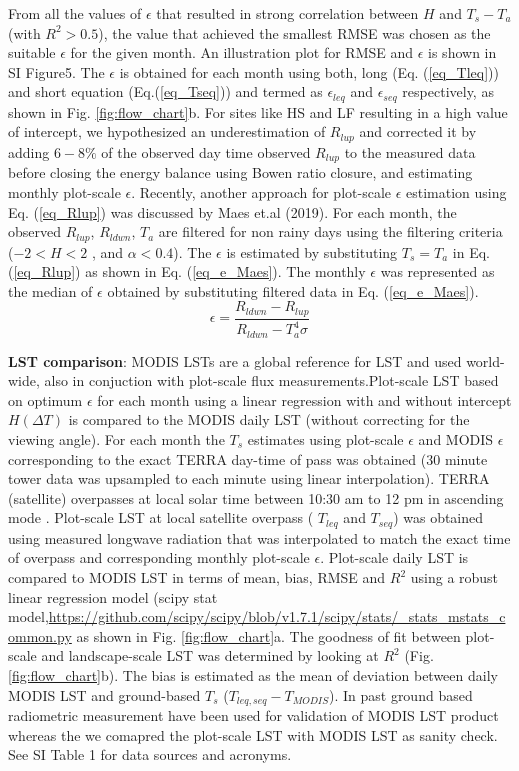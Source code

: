 \documentclass[fleqn,10pt]{wlscirep}
\begin{document}
From all the values of $\epsilon$ that resulted in strong correlation between $H$ and $T_{s}-T_{a}$ (with $R^{2}>0.5$), the value that achieved the smallest RMSE was chosen as the suitable $\epsilon$ for the given month. An illustration plot for RMSE and $\epsilon$ is shown in SI Figure5. The $\epsilon$ is obtained for each month using both, long (Eq. (\ref{eq_Tleq})) and short equation (Eq.(\ref{eq_Tseq})) and termed as $\epsilon_{leq}$ and $\epsilon_{seq}$ respectively, as shown in Fig. \ref{fig:flow_chart}b. For sites like HS and LF resulting in a high value of intercept, we hypothesized an underestimation of $R_{lup}$ and corrected it by adding $6-8\%$ of the observed day time observed $R_{lup}$ to the measured data before closing the energy balance using Bowen ratio closure, and estimating monthly plot-scale $\epsilon$. 
Recently, another approach for plot-scale $\epsilon$ estimation using Eq. (\ref{eq_Rlup}) was discussed by Maes et.al (2019)\cite{maes2019potential}. For each month, the observed $R_{lup}$,  $R_{ldwn}$, $T_{a}$  are filtered for non rainy days using the filtering criteria ($-2 < H <2$ , and $\alpha < 0.4$). The $\epsilon$ is estimated by substituting $T_{s} = T_{a}$ in Eq. (\ref{eq_Rlup}) as shown in Eq. (\ref{eq_e_Maes}). The monthly $\epsilon$  was represented as the median of $\epsilon$ obtained by substituting filtered data in Eq. (\ref{eq_e_Maes}). 
\begin{equation}\label{eq_e_Maes}
\epsilon = \frac{R_{ldwn} - R_{lup}}{R_{ldwn} - T_{a}^{4} \sigma}
\end{equation}

\textbf{LST comparison}: MODIS LSTs are a global reference for LST and used world-wide, also in conjuction with plot-scale flux measurements.Plot-scale LST based on optimum $\epsilon$ for each month using a linear regression with and without intercept $H(\Delta T)$ is compared to the MODIS daily LST (without correcting for the viewing angle). For each month the $T_{s}$ estimates using plot-scale $\epsilon$ and MODIS $\epsilon$ corresponding to the exact TERRA day-time of pass was obtained (30 minute tower data was upsampled to each minute using linear interpolation). TERRA (satellite) overpasses at local solar time between 10:30 am to 12 pm in ascending mode \cite{guillevic2017land}. Plot-scale LST at local satellite overpass ( $T_{leq}$ and $T_{seq}$) was obtained using measured longwave radiation that was interpolated to match the exact time of overpass and corresponding monthly plot-scale $\epsilon$. Plot-scale daily LST is compared to MODIS LST in terms of mean, bias, RMSE and $R^2$ using a robust linear regression model (scipy stat model,\url{https://github.com/scipy/scipy/blob/v1.7.1/scipy/stats/_stats_mstats_common.py} 
 as shown in Fig. \ref{fig:flow_chart}a. The goodness of fit between plot-scale and landscape-scale LST was determined by looking at $R^2$ (Fig. \ref{fig:flow_chart}b). The bias is estimated as the mean of deviation between daily MODIS LST and ground-based $T_{s}$ ($T_{leq,seq} - T_{MODIS}$). In past ground based radiometric measurement have been used for validation of MODIS LST product \cite{wang2008validating} whereas the we comapred the plot-scale LST with MODIS LST as sanity check. See SI Table 1 for data sources and acronyms.
 
\end{document}
